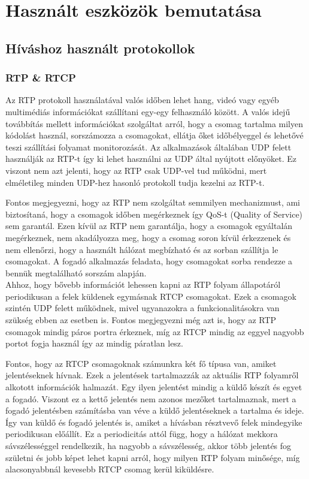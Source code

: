 \chapter{Használt eszközök bemutatása}

\section{Híváshoz használt protokollok}

\subsection{RTP \& RTCP}

Az RTP protokoll használatával valós időben lehet hang, videó vagy egyéb multimédiás 
információkat szállítani egy-egy felhasználó között. A valós idejű továbbítás mellett
információkat szolgáltat arról, hogy a csomag tartalma milyen kódolást használ, 
sorszámozza a csomagokat, ellátja őket időbélyeggel és lehetővé teszi szállítási folyamat
monitorozását. Az alkalmazások általában UDP felett használják az RTP-t így ki lehet
használni az UDP által nyújtott előnyöket. Ez viszont nem azt jelenti, hogy az RTP
csak UDP-vel tud működni, mert elméletileg minden UDP-hez hasonló protokoll tudja kezelni
az RTP-t.

Fontos megjegyezni, hogy az RTP nem szolgáltat semmilyen mechanizmust, ami biztosítaná,
hogy a csomagok időben megérkeznek így QoS-t (Quality of Service) sem garantál. Ezen kívül
az RTP nem garantálja, hogy a csomagok egyáltalán megérkeznek, nem akadályozza meg, hogy a 
csomag soron kívül érkezzenek és nem ellenőrzi, hogy a használt hálózat megbízható és az
sorban szállítja le csomagokat. A fogadó alkalmazás feladata, hogy csomagokat sorba rendezze
a bennük megtalálható sorszám alapján. \\

Ahhoz, hogy bővebb információt lehessen kapni az RTP folyam állapotáról periodikusan a 
felek küldenek egymásnak RTCP csomagokat. Ezek a csomagok szintén UDP felett működnek,
mivel ugyanazokra a funkcionalitásokra van szükség ebben az esetben is. Fontos megjegyezni
még azt is, hogy az RTP csomagok mindig páros portra érkeznek, míg az RTCP mindig az eggyel
nagyobb portot fogja használ így az mindig páratlan lesz.

Fontos, hogy az RTCP csomagoknak számunkra két fő típusa van, amiket jelentéseknek hívnak.
Ezek a jelentések tartalmazzák az aktuális RTP folyamről alkotott információk halmazát. Egy
ilyen jelentést mindig a küldő készít és egyet a fogadó. Viszont ez a kettő jelentés nem azonos
mezőket tartalmaznak, mert a fogadó jelentésben számításba van véve a küldő jelentéseknek 
a tartalma és ideje. Így van küldő és fogadó jelentés is, amiket a hívásban résztvevő felek 
mindegyike periodikusan előállít. Ez a periodicitás attól függ, hogy a hálózat mekkora 
sávszélességgel rendelkezik, ha nagyobb a sávszélesség, akkor több jelentés fog születni és
jobb képet lehet kapni arról, hogy milyen RTP folyam minősége, míg alacsonyabbnál kevesebb
RTCP csomag kerül kiküldésre. 

